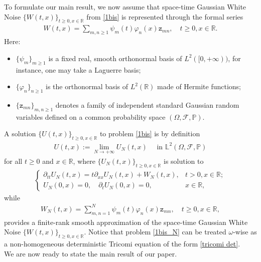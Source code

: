 \documentclass{article}
\begin{document}
To formulate our main result, we now assume that space-time Gaussian White Noise $\{W(t,x)\}_{t\geq 0,x\in\mathbb{R}}$ from \eqref{1bis} is represented through the formal series 
\begin{align}\label{serie}
W(t,x)=\sum_{m,n\geq 1}\psi_m(t)\varphi_n(x)\mathtt{z}_{mn},\quad t\geq 0,x\in\mathbb{R}.
\end{align} 
Here:
\begin{itemize}
\item $\{\psi_m\}_{m\geq 1}$ is a fixed real, smooth orthonormal basis
  of $L^2([0,+\infty))$, for instance, one may take a Laguerre basis;
\item $\{\varphi_n\}_{n\geq 1}$ is the orthonormal basis of $L^2(\mathbb{R})$ made of Hermite functions;
\item $\{\mathtt{z}_{mn}\}_{m,n\geq 1}$ denotes a family of independent standard Gaussian random variables defined on a common probability space $(\Omega,\mathcal{F},\mathbb{P})$.
\end{itemize}
A solution $\{U(t,x)\}_{t\geq 0,x\in\mathbb{R}}$ to problem \eqref{1bis} is by definition 
\begin{align*}
U(t,x):=\lim_{N\to+\infty}U_N(t,x)\quad\mbox{ in }\mathbb{L}^2(\Omega,\mathcal{F},\mathbb{P})
\end{align*}
for all $t\geq 0$ and $x\in\mathbb{R}$, where $\{U_N(t,x)\}_{t\geq 0,x\in\mathbb{R}}$ is solution to
\begin{align}\label{1bis_N}
\begin{cases}
\partial_{tt}U_N(t,x)=t\partial_{xx}U_N(t,x)+W_N(t,x),& t>0,x\in\mathbb{R};\\
U_N(0,x)=0,\quad \partial_{t}U_N(0,x)=0,& x\in\mathbb{R},
\end{cases}
\end{align}  
while
\begin{align*}
W_N(t,x)=\sum_{m,n= 1}^N\psi_m(t)\varphi_n(x)\mathtt{z}_{mn},\quad t\geq 0,x\in\mathbb{R}, 
\end{align*} 
provides a finite-rank smooth approximation of the space-time Gaussian White Noise $\{W(t,x)\}_{t\geq 0,x\in\mathbb{R}}$. Notice that problem \eqref{1bis_N} can be treated $\omega$-wise as a non-homogeneous deterministic Tricomi equation of the form \eqref{tricomi det}. \\
We are now ready to state the main result of our paper.
\end{document}
